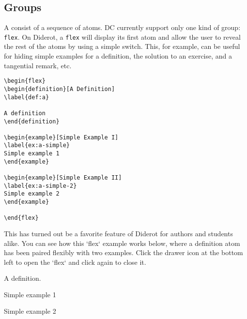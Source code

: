 \subsection{Groups}
\label{sec:mtl::groups}

\begin{definition}[Group]
A  consist of a sequence of atoms.  DC currently support only one kind of group: \lstinline`flex`.  On Diderot, a \lstinline`flex` will display its first atom and allow the user to reveal the rest of the atoms by using a simple switch.  This, for example, can be useful for hiding simple examples for a definition, the solution to an exercise, and a tangential remark, etc. 

\begin{lstlisting}
\begin{flex}
\begin{definition}[A Definition]
\label{def:a}

A definition
\end{definition}

\begin{example}[Simple Example I]
\label{ex:a-simple}
Simple example 1
\end{example}

\begin{example}[Simple Example II]
\label{ex:a-simple-2}
Simple example 2
\end{example}

\end{flex}
\end{lstlisting}
\end{definition}

\begin{note}
This has turned out be a favorite feature of Diderot for authors and students alike. 
%
You can see how this `flex` example works below, where a definition atom
has been paired flexibly with two examples.  Click the drawer icon
at the bottom left to open the `flex` and click again to close it.
\end{note}

\begin{flex}
\begin{definition}[A Definition]
\label{def:a}
A definition.
\end{definition}

\begin{example}
\label{ex:simple-1}
Simple example 1
\end{example}

\begin{example}
\label{ex:simple-2}
Simple example 2
\end{example}

\end{flex}
  

